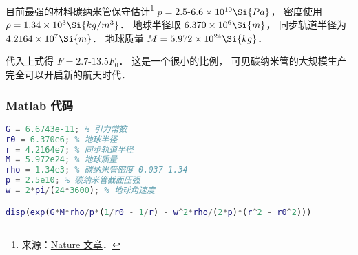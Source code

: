目前最强的材料碳纳米管保守估计\footnote{来源：\href{https://www.nature.com/articles/s41467-019-10959-7}{Nature 文章}．} $p = 2.5$-$6.6\times 10^{10} \Si{Pa}$， 密度使用 $\rho = 1.34\times 10^{3} \Si{kg/m^3}$． 地球半径取 $6.370\times 10^6\Si{m}$， 同步轨道半径为 $4.2164\times 10^7 \Si{m}$． 地球质量 $M = 5.972 \times 10^{24} \Si{kg}$．

代入上式得 $F = 2.7$-$13.5 F_0$． 这是一个很小的比例， 可见碳纳米管的大规模生产完全可以开启新的航天时代．

\subsubsection{Matlab 代码}
\begin{lstlisting}[language=matlab]
G = 6.6743e-11; % 引力常数
r0 = 6.370e6; % 地球半径
r = 4.2164e7; % 同步轨道半径
M = 5.972e24; % 地球质量
rho = 1.34e3; % 碳纳米管密度 0.037-1.34
p = 2.5e10; % 碳纳米管截面压强
w = 2*pi/(24*3600); % 地球角速度

disp(exp(G*M*rho/p*(1/r0 - 1/r) - w^2*rho/(2*p)*(r^2 - r0^2)))
\end{lstlisting}
